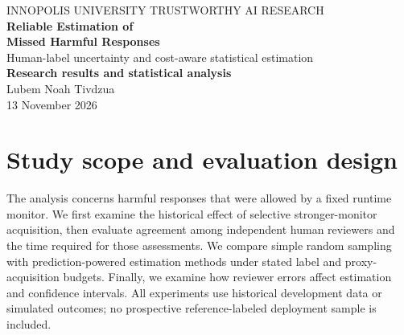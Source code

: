 \documentclass[11pt,a4paper]{article}
\begin{document}
\begin{center}
{\small\scshape INNOPOLIS UNIVERSITY \;\textbar\; TRUSTWORTHY AI RESEARCH}\\[9mm]
{\Huge\bfseries\color{navy} Reliable Estimation of\\[1mm] Missed Harmful Responses}\\[4mm]
{\Large\color{graytext} Human-label uncertainty and cost-aware statistical estimation}\\[8mm]
{\large\bfseries Research results and statistical analysis}\\[3mm]
{\normalsize Lubem Noah Tivdzua}\\[2mm]
{\small 13 November 2026}
\end{center}
\vspace{6mm}
\begin{abstract}
We study the prevalence of harmful assistant responses that pass a runtime safety monitor, $A=P(Y=1,D=0)$, where $Y$ denotes response-level policy harm and $D=0$ denotes an allowed response. The analysis combines historical monitor decisions, a blinded human-review study of 96 cases and 336 assessments, and cost-matched comparisons of sampling and prediction-powered estimators. In a 1,687-response development comparison, selective Qwen acquisition reduced the number of historically labeled harmful allowed responses from 229 to 228. At a budget of 160 historical-label evaluations, allowed-only simple random sampling achieved RMSE 0.02369, compared with 0.02542--0.03552 for the tested StratPPI mean designs. Simulations using empirical review durations show that gains under error-free labeling can disappear when reviewers make independent or correlated errors. The human study also found substantial disagreement (Fleiss' $\kappa=0.3082$), limiting the interpretation of any single set of ratings as reference truth. We examine interval coverage, allocation optimization and recorded inference costs, and outline a small prospective validation study. The present results support further investigation of reference-label reliability and review efficiency; they do not establish the prevalence of latent harm in a fresh deployment population.
\end{abstract}
\vspace{3mm}

\section{Study scope and evaluation design}
The analysis concerns harmful responses that were allowed by a fixed runtime monitor. We first examine the historical effect of selective stronger-monitor acquisition, then evaluate agreement among independent human reviewers and the time required for those assessments. We compare simple random sampling with prediction-powered estimation methods under stated label and proxy-acquisition budgets. Finally, we examine how reviewer errors affect estimation and confidence intervals. All experiments use historical development data or simulated outcomes; no prospective reference-labeled deployment sample is included.
\end{document}

